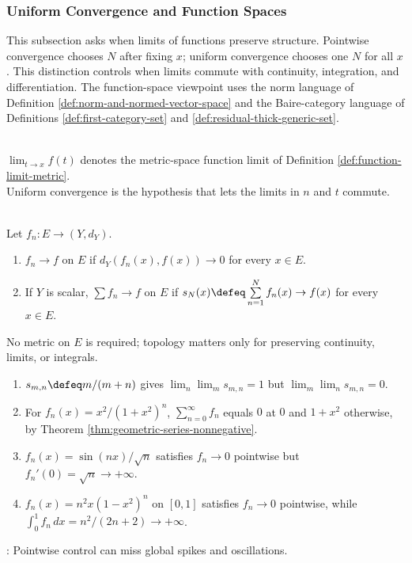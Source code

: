 \subsubsection{Uniform Convergence and Function Spaces}


This subsection asks when limits of functions preserve structure. Pointwise convergence chooses $N$ after fixing $x$; uniform convergence chooses one $N$ for all $x$. This distinction controls when limits commute with continuity, integration, and differentiation. The function-space viewpoint uses the norm language of Definition \ref{def:norm-and-normed-vector-space} and the Baire-category language of Definitions \ref{def:first-category-set} and \ref{def:residual-thick-generic-set}.

\begin{perspective} \label{per:function-limits-before-function-sequences} \\
$\lim_{t\to x}f(t)$ denotes the metric-space function limit of Definition \ref{def:function-limit-metric}.\\
Uniform convergence is the hypothesis that lets the limits in $n$ and $t$ commute.
\end{perspective}

\begin{definition} \label{def:pointwise-convergence-functions} \\
Let $f_n:E\to(Y,d_Y)$.
\begin{enumerate}[label=(\roman*)]
\setlength{\itemsep}{0pt}
\item $f_n\to f$  on $E$ if $d_Y(f_n(x),f(x))\to0$ for every $x\in E$.
\item If $Y$ is scalar, $\sum f_n\to f$  on $E$ if $s_N(x)\defeq\sum\limits_{n=1}^{N}f_n(x)\to f(x)$ for every $x\in E$.
\end{enumerate}
No metric on $E$ is required; topology matters only for preserving continuity, limits, or integrals.
\end{definition}

\begin{example} \label{ex:pointwise-limits-do-not-preserve-structure} 
\begin{enumerate}[label=(\roman*)]
\setlength{\itemsep}{0pt}
\item $s_{m,n}\defeq m/(m+n)$ gives $\lim_n\lim_m s_{m,n}=1$ but $\lim_m\lim_n s_{m,n}=0$.
\item For $f_n(x)=x^2/(1+x^2)^n$, $\sum_{n=0}^{\infty}f_n$ equals $0$ at $0$ and $1+x^2$ otherwise, by Theorem \ref{thm:geometric-series-nonnegative}.
\item $f_n(x)=\sin(nx)/\sqrt n$ satisfies $f_n\to0$ pointwise but $f_n'(0)=\sqrt n\to+\infty$.
\item $f_n(x)=n^2x(1-x^2)^n$ on $[0,1]$ satisfies $f_n\to0$ pointwise, while $\int_0^1 f_n\,dx=n^2/(2n+2)\to+\infty$.
\end{enumerate}
: Pointwise control can miss global spikes and oscillations.
\end{example}

